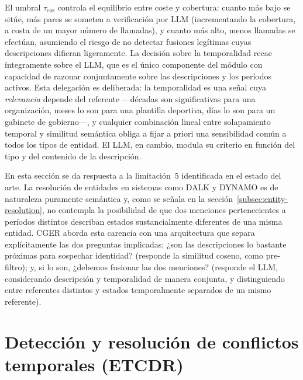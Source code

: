 El umbral $\tau_{\cos}$ controla el equilibrio entre coste y cobertura: cuanto más bajo se sitúe, más pares se someten a verificación por LLM (incrementando la cobertura, a costa de un mayor número de llamadas), y cuanto más alto, menos llamadas se efectúan, asumiendo el riesgo de no detectar fusiones legítimas cuyas descripciones difieran ligeramente. La decisión sobre la temporalidad recae íntegramente sobre el LLM, que es el único componente del módulo con capacidad de razonar conjuntamente sobre las descripciones y los períodos activos. Esta delegación es deliberada: la temporalidad es una señal cuya \emph{relevancia} depende del referente —décadas son significativas para una organización, meses lo son para una plantilla deportiva, días lo son para un gabinete de gobierno—, y cualquier combinación lineal entre solapamiento temporal y similitud semántica obliga a fijar a priori una sensibilidad común a todos los tipos de entidad. El LLM, en cambio, modula su criterio en función del tipo y del contenido de la descripción.


En esta sección se da respuesta a la limitación~5 identificada en el estado del arte. La resolución de entidades en sistemas como DALK y DYNAMO es de naturaleza puramente semántica y, como se señala en la sección~\ref{subsec:entity-resolution}, no contempla la posibilidad de que dos menciones pertenecientes a períodos distintos describan estados sustancialmente diferentes de una misma entidad. CGER aborda esta carencia con una arquitectura que separa explícitamente las dos preguntas implicadas: ¿son las descripciones lo bastante próximas para sospechar identidad? (responde la similitud coseno, como pre-filtro); y, si lo son, ¿debemos fusionar las dos menciones? (responde el LLM, considerando descripción y temporalidad de manera conjunta, y distinguiendo entre referentes distintos y estados temporalmente separados de un mismo referente).

\section{Detección y resolución de conflictos temporales (ETCDR)}\label{sec:bt-etcdr}

